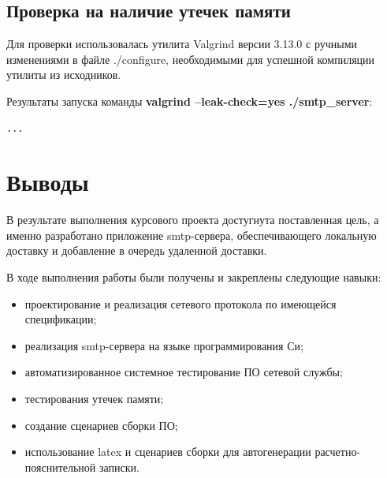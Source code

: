 \documentclass[a4paper,12pt]{report}
\begin{document}
\section{Проверка на наличие утечек памяти}

Для проверки использовалась утилита Valgrind версии 3.13.0 с ручными изменениями в файле ./configure, необходимыми для успешной компиляции утилиты из исходников.

Результаты запуска команды \textbf{valgrind --leak-check=yes ./smtp\_server}:

\begin{verbatim}
...
\end{verbatim}




\chapter*{Выводы}

В результате выполнения курсового проекта достугнута поставленная цель, а именно разработано приложение smtp-сервера, обеспечивающего локальную доставку и добавление в очередь удаленной доставки.

В ходе выполнения работы были получены и закреплены следующие навыки:
\begin{itemize}
    \item проектирование и реализация сетевого протокола по имеющейся спецификации;
    \item реализация smtp-сервера на языке программирования Си;
    \item автоматизированное системное тестирование ПО сетевой службы;
    \item тестирования утечек памяти; 
    \item создание сценариев сборки ПО;
    \item использование latex и сценариев сборки для автогенерации расчетно-пояснительной записки.
\end{itemize}
\end{document}
